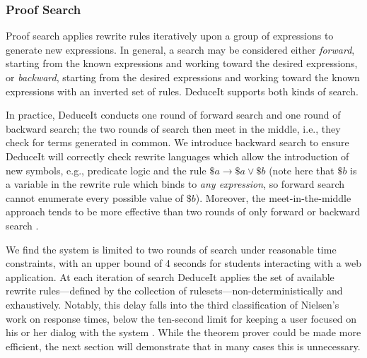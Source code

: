 \documentclass{sigchi}
\begin{document}
\subsubsection{Proof Search}

Proof search applies rewrite rules iteratively upon a group of expressions to generate new expressions. In general, a search may be considered either \textit{forward}, starting from the known expressions and working toward the desired expressions, or \textit{backward}, starting from the desired expressions and working toward the known expressions with an inverted set of rules. DeduceIt supports both kinds of search. 


In practice, DeduceIt conducts one round of forward search and one round of backward search; the two rounds of search then meet in the middle, i.e., they check for terms generated in common. We introduce backward search to ensure DeduceIt will correctly check rewrite languages which allow the introduction of new symbols, e.g., predicate logic and the rule $\$a \rightarrow \$a \vee \$b$ (note here that $\$b$ is a variable in the rewrite rule which binds to \textit{any expression}, so forward search cannot enumerate every possible value of $\$b$). Moreover, the meet-in-the-middle approach tends to be more effective than two rounds of only forward or backward search \cite{bisearch}.

We find the system is limited to two rounds of search under reasonable time constraints, with an upper bound of 4 seconds for students interacting with a web application. At each iteration of search DeduceIt applies the set of available rewrite rules---defined by the collection of rulesets---non-deterministically and exhaustively. Notably, this delay falls into the third classification of Nielsen's work on response times, below the ten-second limit for keeping a user focused on his or her dialog with the system \cite{neilsen}. While the theorem prover could be made more efficient, the next section will demonstrate that in many cases this is unnecessary.
\end{document}
